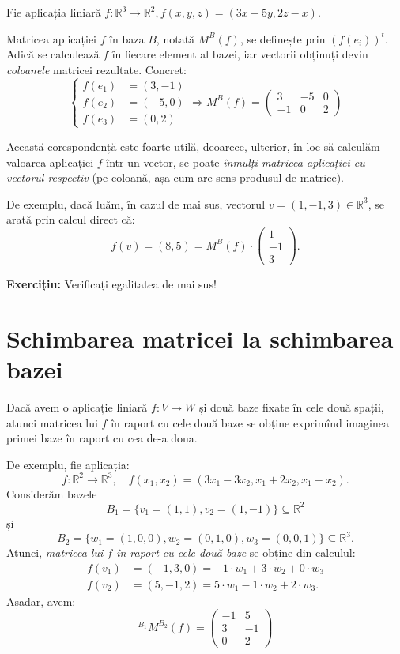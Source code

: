 \documentclass[11pt,a4paper]{article}
\newcommand\seq{\subseteq}
\newcommand\RR{\mathbb{R}}
\theoremstyle{dotless}
\theoremstyle{dotlessdr}
\begin{document}
Fie aplicația liniară $f : \RR^3 \to \RR^2, f(x, y, z) = (3x - 5y, 2z - x)$.

Matricea aplicației $f$ în baza $B$, notată $M^B(f)$, se definește prin $(f(e_i))^t$.
Adică se calculează $f$ în fiecare element al bazei, iar vectorii obținuți devin
\emph{coloanele} matricei rezultate. Concret:
\[
  \begin{cases}
    f(e_1) &= (3, -1) \\
    f(e_2) &= (-5, 0) \\
    f(e_3) &= (0, 2)
  \end{cases} \Rightarrow %
  M^B(f) =
  \begin{pmatrix}
    3 & -5 & 0 \\
    -1 & 0 & 2
  \end{pmatrix}
\]

Această corespondență este foarte utilă, deoarece, ulterior, în loc să calculăm
valoarea aplicației $f$ într-un vector, se poate \emph{înmulți matricea aplicației %
  cu vectorul respectiv} (pe coloană, așa cum are sens produsul de matrice).

De exemplu, dacă luăm, în cazul de mai sus, vectorul $v = (1, -1, 3) \in \RR^3$,
se arată prin calcul direct că:
\[
  f(v) = (8, 5) = M^B(f) \cdot \begin{pmatrix} 1 \\ -1 \\ 3 \end{pmatrix}.
\]

\textbf{Exercițiu:} Verificați egalitatea de mai sus!


\section{Schimbarea matricei la schimbarea bazei}
\label{sec:mat-trecere}

Dacă avem o aplicație liniară $f : V \to W$ și două baze fixate în
cele două spații, atunci matricea lui $f$ în raport cu cele două baze
se obține exprimînd imaginea primei baze în raport cu cea de-a doua.

De exemplu, fie aplicația:
\[
  f : \RR^2 \to \RR^3, \quad f(x_1, x_2) = (3x_1 - 3x_2, x_1 + 2x_2, x_1 - x_2).
\]
Considerăm bazele
\[
  B_1 = \{ v_1 = (1, 1), v_2 = (1, -1) \} \seq \RR^2
\]
și
\[
  B_2 = \{ w_1 = (1, 0, 0), w_2 = (0, 1, 0), w_3 = (0, 0, 1) \} \seq \RR^3.
\]
Atunci, \emph{matricea lui $f$ în raport cu cele două baze} se obține din calculul:
\begin{align*}
  f(v_1) &= (-1, 3, 0) = -1 \cdot w_1 + 3 \cdot w_2 + 0 \cdot w_3 \\
  f(v_2) &= (5, -1, 2) = 5 \cdot w_1 - 1 \cdot w_2 + 2 \cdot w_3.
\end{align*}
Așadar, avem:
\[
  {}^{B_1} M^{B_2} (f) =
  \begin{pmatrix}
    -1 & 5 \\
    3 & -1 \\
    0 & 2
  \end{pmatrix}
\]
\end{document}
